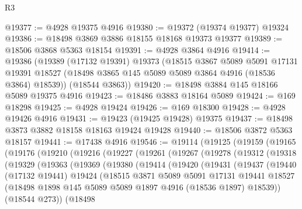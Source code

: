 \begin{lexlean}{R3}
\begin{coremodule}
@19377 := @4928 @19375 @4916
@19380 := @19372 (@19374 @19377) @19324
@19386 := @18498 @3869 @3886 @18155 @18168 @19373 @19377
@19389 := @18506 @3868 @5363 @18154
@19391 := @4928 @3864 @4916
@19414 := @19386
    (@19389
      (@17132 @19391)
      @19373
      (@18515
        @3867
        @5089
        @5091
        @17131
        @19391
        @18527
        (@18498 @3865 @145 @5089 @5089 @3864 @4916 (@18536 @3864) @18539))
      (@18544 @3863))
@19420 := @18498 @3884 @145 @18166 @5089 @19375 @4916
@19423 := @18486 @3883 @18164 @5089
@19424 := @169 @18298
@19425 := @4928 @19424
@19426 := @169 @18300
@19428 := @4928 @19426 @4916
@19431 := @19423 (@19425 @19428) @19375
@19437 := @18498 @3873 @3882 @18158 @18163 @19424 @19428
@19440 := @18506 @3872 @5363 @18157
@19441 := @17438 @4916
@19546 := @19114
    (@19125
      (@19159
        (@19165
          (@19176
            (@19210
              (@19216
                (@19227
                  (@19261
                    (@19267
                      (@19278
                        (@19312
                          (@19318
                            (@19329
                              (@19363
                                (@19369
                                  (@19380
                                    (@19414
                                      (@19420
                                        (@19431
                                          (@19437
                                            (@19440
                                              (@17132 @19441)
                                              @19424
                                              (@18515
                                                @3871
                                                @5089
                                                @5091
                                                @17131
                                                @19441
                                                @18527
                                                (@18498
                                                  @1898
                                                  @145
                                                  @5089
                                                  @5089
                                                  @1897
                                                  @4916
                                                  (@18536 @1897)
                                                  @18539))
                                              (@18544 @273))
                                            (@18498

\end{coremodule}
\end{lexlean}
